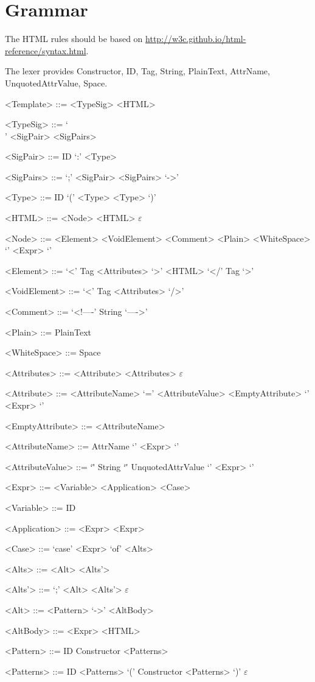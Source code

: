 \documentclass{report}
\begin{document}
\setlength{\grammarparsep}{4pt} %
\setlength{\grammarindent}{12em} %

\section*{Grammar}

The HTML rules should be based on
\url{http://w3c.github.io/html-reference/syntax.html}.

The lexer provides Constructor, ID, Tag, String, PlainText,
AttrName, UnquotedAttrValue, Space.

\begin{grammar}

<Template> ::= <TypeSig> <HTML>

<TypeSig> ::= `\\' <SigPair> <SigPairs>

<SigPair> ::= ID `:' <Type>

<SigPairs> ::= `;' <SigPair> <SigPairs>
\alt `->'

<Type> ::= ID
\alt `(' <Type> <Type> `)'

<HTML> ::= <Node> <HTML>
\alt $\varepsilon$

<Node> ::= <Element>
\alt <VoidElement>
\alt <Comment>
\alt <Plain>
\alt <WhiteSpace>
\alt `{' <Expr> `}'

<Element> ::= `<' Tag <Attributes> `>' <HTML> `</' Tag `>'

<VoidElement> ::= `<' Tag <Attributes> `/>'

<Comment> ::= `<!----' String `---->'

<Plain> ::= PlainText

<WhiteSpace> ::= Space

<Attributes> ::= <Attribute> <Attributes>
\alt $\varepsilon$

<Attribute> ::= <AttributeName> `=' <AttributeValue>
\alt <EmptyAttribute>
\alt `{' <Expr> `}'

<EmptyAttribute> ::= <AttributeName>

<AttributeName> ::= AttrName
\alt `{' <Expr> `}'

<AttributeValue> ::= `\"' String `\"'
\alt UnquotedAttrValue
\alt `{' <Expr> `}'

<Expr> ::= <Variable>
\alt <Application>
\alt <Case>

<Variable> ::= ID

<Application> ::= <Expr> <Expr>

<Case> ::= `case' <Expr> `of' <Alts>

<Alts> ::= <Alt> <Alts'>

<Alts'> ::= `;' <Alt> <Alts'>
\alt $\varepsilon$

<Alt> ::= <Pattern> `->' <AltBody>

<AltBody> ::= <Expr>
\alt <HTML>

<Pattern> ::= ID
\alt Constructor <Patterns>

<Patterns> ::= ID <Patterns>
\alt `(' Constructor <Patterns> `)'
\alt $\varepsilon$


\end{grammar}
\end{document}
